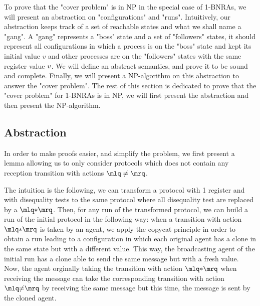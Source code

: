 To prove that the "cover problem" is in NP in the special case of 1-BNRAs, we will present an abstraction on "configurations" and "runs". Intuitively, our abstraction keeps track of a set of reachable states and what we shall name a "gang". A "gang" represents a "boss" state and a set of "followers" states, it should represent all configurations in which a process is on the "boss" state and kept its initial value $v$ and other processes are on the "followers" states with the same register value $v$. We will define an abstract semantics, and prove it to be sound and complete. Finally, we will present a NP-algorithm on this abstraction to answer the "cover problem". The rest of this section is dedicated to prove that the "cover problem" for 1-BNRAs is in NP, we will first present the abstraction and then present the NP-algorithm.

\subsection{Abstraction }
In order to make proofs easier, and simplify the problem, we first present a lemma allowing us to only consider protocols which does not contain any reception transition with actions $\quotemarks{\ne}$.

The intuition is the following, we can transform a protocol with 1 register and with disequality tests to the same protocol where all disequality test are replaced by a $\quotemarks{\dummyact}$. Then, for any run of the transformed protocol, we can build a run of the initial protocol in the following way: when a transition with action $\quotemarks{\dummyact}$ is taken by an agent, we apply the copycat principle in order to obtain a run leading to a configuration in which each original agent has a clone in the same state but with a different value. This way, the broadcasting agent of the initial run has a clone able to send the same message but with a fresh value. Now, the agent orginally taking the transition with action $\quotemarks{\dummyact}$ when receiving the message can take the corresponding transition with action $\quotemarks{\diseqtestact}$  by receiving the same message but this time, the message is sent by the cloned agent.









